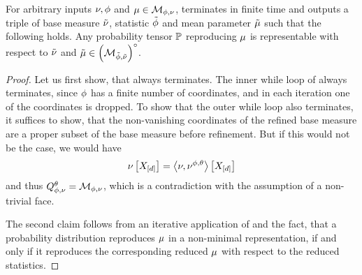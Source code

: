 \begin{theorem}\label{the:baseMeasureRefinement}
	For arbitrary inputs $\nu,\phi$ and $\mu\in\mathcal{M}_{\phi,\nu}$,  terminates in finite time and outputs a triple of base measure $\tilde{\nu}$, statistic $\tilde{\phi}$ and mean parameter $\tilde{\mu}$ such that the following holds.
	Any probability tensor $\mathbb{P}$ reproducing $\mu$ is representable with respect to $\tilde{\nu}$ and $\tilde{\mu}\in{\left(\mathcal{M}_{\tilde{\phi},\tilde{\nu}}\right)}^{\circ}$.
\end{theorem}
\begin{proof}
	Let us first show, that  always terminates.
	The inner while loop of  always terminates, since $\phi$ has a finite number of coordinates, and in each iteration one of the coordinates is dropped.
	To show that the outer while loop also terminates, it suffices to show, that the non-vanishing coordinates of the refined base measure are a proper subset of the base measure before refinement.
	But if this would not be the case, we would have 
		\[ \nu\left[X_{[d]}\right] = \left\langle \nu,\nu^{\phi,\theta}\right\rangle \left[ X_{[d]} \right] \]
	and thus $Q^{\theta}_{\phi,\nu}=\mathcal{M}_{\phi,\nu}$, which is a contradiction with the assumption of a non-trivial face.
	
	The second claim follows from an iterative application of  and the fact, that a probability distribution reproduces $\mu$ in a non-minimal representation, if and only if it reproduces the corresponding reduced $\mu$ with respect to the reduced statistics.
\end{proof}


